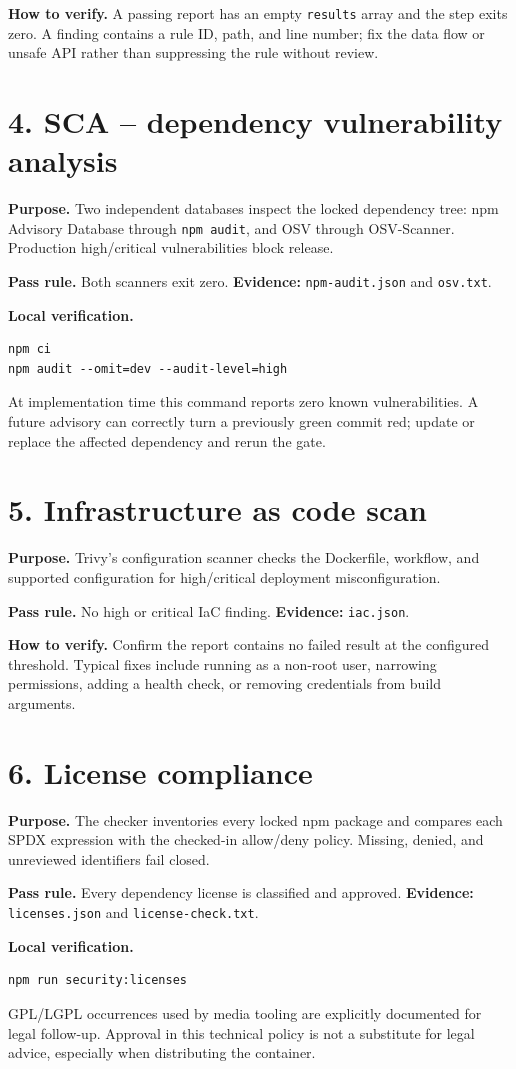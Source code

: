 \documentclass[11pt,a4paper]{article}
\newcommand{\stage}[2]{\section{#1. #2}}
\newcommand{\evidence}[1]{\textbf{Evidence:} \texttt{#1}}
\begin{document}
\textbf{How to verify.} A passing report has an empty \texttt{results} array and the step exits zero. A finding contains a rule ID, path, and line number; fix the data flow or unsafe API rather than suppressing the rule without review.

\stage{4}{SCA -- dependency vulnerability analysis}

\textbf{Purpose.} Two independent databases inspect the locked dependency tree: npm Advisory Database through \texttt{npm audit}, and OSV through OSV-Scanner. Production high/critical vulnerabilities block release.

\textbf{Pass rule.} Both scanners exit zero. \evidence{npm-audit.json} and \texttt{osv.txt}.

\textbf{Local verification.}
\begin{lstlisting}
npm ci
npm audit --omit=dev --audit-level=high
\end{lstlisting}
At implementation time this command reports zero known vulnerabilities. A future advisory can correctly turn a previously green commit red; update or replace the affected dependency and rerun the gate.

\stage{5}{Infrastructure as code scan}

\textbf{Purpose.} Trivy's configuration scanner checks the Dockerfile, workflow, and supported configuration for high/critical deployment misconfiguration.

\textbf{Pass rule.} No high or critical IaC finding. \evidence{iac.json}.

\textbf{How to verify.} Confirm the report contains no failed result at the configured threshold. Typical fixes include running as a non-root user, narrowing permissions, adding a health check, or removing credentials from build arguments.

\stage{6}{License compliance}

\textbf{Purpose.} The checker inventories every locked npm package and compares each SPDX expression with the checked-in allow/deny policy. Missing, denied, and unreviewed identifiers fail closed.

\textbf{Pass rule.} Every dependency license is classified and approved. \evidence{licenses.json} and \texttt{license-check.txt}.

\textbf{Local verification.}
\begin{lstlisting}
npm run security:licenses
\end{lstlisting}
GPL/LGPL occurrences used by media tooling are explicitly documented for legal follow-up. Approval in this technical policy is not a substitute for legal advice, especially when distributing the container.
\end{document}
